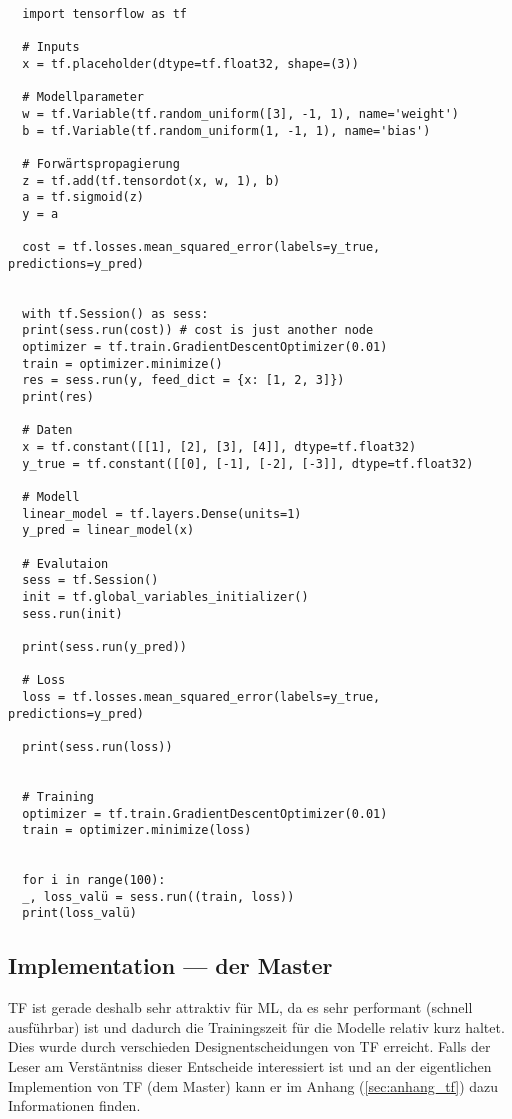 \begin{verbatim}
  import tensorflow as tf

  # Inputs
  x = tf.placeholder(dtype=tf.float32, shape=(3))

  # Modellparameter
  w = tf.Variable(tf.random_uniform([3], -1, 1), name='weight')
  b = tf.Variable(tf.random_uniform(1, -1, 1), name='bias')

  # Forwärtspropagierung
  z = tf.add(tf.tensordot(x, w, 1), b)
  a = tf.sigmoid(z)
  y = a

  cost = tf.losses.mean_squared_error(labels=y_true, predictions=y_pred)


  with tf.Session() as sess:
  print(sess.run(cost)) # cost is just another node
  optimizer = tf.train.GradientDescentOptimizer(0.01)
  train = optimizer.minimize()
  res = sess.run(y, feed_dict = {x: [1, 2, 3]})
  print(res)

  # Daten
  x = tf.constant([[1], [2], [3], [4]], dtype=tf.float32)
  y_true = tf.constant([[0], [-1], [-2], [-3]], dtype=tf.float32)

  # Modell
  linear_model = tf.layers.Dense(units=1)
  y_pred = linear_model(x)

  # Evalutaion
  sess = tf.Session()
  init = tf.global_variables_initializer()
  sess.run(init)

  print(sess.run(y_pred))

  # Loss
  loss = tf.losses.mean_squared_error(labels=y_true, predictions=y_pred)

  print(sess.run(loss))


  # Training
  optimizer = tf.train.GradientDescentOptimizer(0.01)
  train = optimizer.minimize(loss)


  for i in range(100):
  _, loss_valü = sess.run((train, loss))
  print(loss_valü)

\end{verbatim}


\subsection{Implementation --- der Master}
TF ist gerade deshalb sehr attraktiv für ML, da es sehr performant (schnell
ausführbar) ist und dadurch die Trainingszeit für die Modelle relativ
kurz haltet. Dies wurde durch verschieden Designentscheidungen von TF erreicht.
\para{}
Falls der Leser am Verstäntniss dieser Entscheide interessiert ist und an der
eigentlichen Implemention von TF (dem Master) kann er im Anhang (\ref{sec:anhang_tf}) dazu
Informationen finden.



